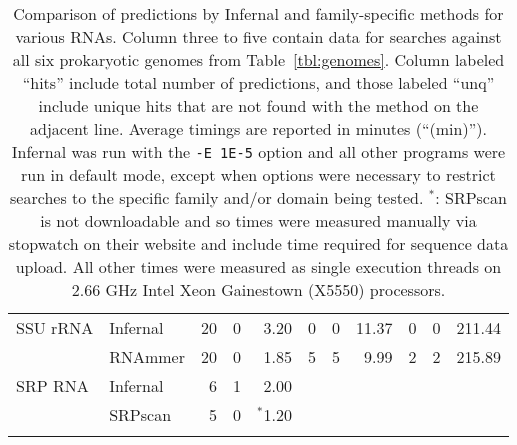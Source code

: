 \begin{small}
\begin{table}
\begin{center}
\begin{tabular}{|l|l|rrr|rrr|rrr|}
SSU rRNA                   &  Infernal                   &   20 &   0 &    3.20 &    0 &   0 &   11.37 &    0 &   0 &  211.44  \\ 
                           &  RNAmmer                    &   20 &   0 &    1.85 &    5 &   5 &    9.99 &    2 &   2 &  215.89  \\ \hline 
SRP RNA                    &  Infernal                   &    6 &   1 &    2.00 &\multicolumn{6}{c}{} \\
                           &  SRPscan                    &    5 &   0 &$^*$1.20 &\multicolumn{6}{c}{} \\ \cline{1-5}
\multicolumn{8}{c}{} \\ 
\end{tabular}
\caption{Comparison of predictions by Infernal and family-specific
  methods for various RNAs. Column three to five contain data for searches
  against all six prokaryotic genomes from Table~\ref{tbl:genomes}.  Column
  labeled ``hits'' include total number of predictions, and those
  labeled ``unq'' include unique hits that are not found with the
  method on the adjacent line. Average timings are reported in minutes
  (``(min)'').  Infernal was run with
  the {\tt -E 1E-5} option and all other programs were run in default
  mode, except when options were necessary to restrict searches to the
  specific family and/or domain being tested. $^*$: SRPscan is not
  downloadable and so times were measured manually via stopwatch on
  their website and include time required for sequence data
  upload. All other times were measured as single execution threads on
  2.66 GHz Intel Xeon Gainestown (X5550) processors.  }
\label{tbl:compare}
\end{center}

\end{table}
\end{small}
